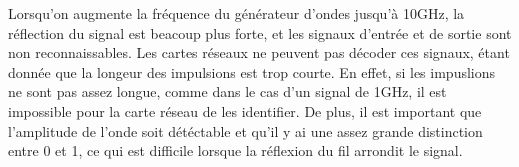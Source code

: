 Lorsqu'on augmente la fréquence du générateur d'ondes jusqu'à 10GHz, la réflection du signal est beacoup plus forte, et les signaux d'entrée et de sortie sont non reconnaissables.
Les cartes réseaux ne peuvent pas décoder ces signaux, étant donnée que la longeur des impulsions est trop courte.
En effet, si les impuslions ne sont pas assez longue, comme dans le cas d'un signal de 1GHz, il est impossible pour la carte réseau de les identifier.
De plus, il est important que l'amplitude de l'onde soit détéctable et qu'il y ai une assez grande distinction entre 0 et 1, ce qui est difficile lorsque la réflexion du fil arrondit le signal.
